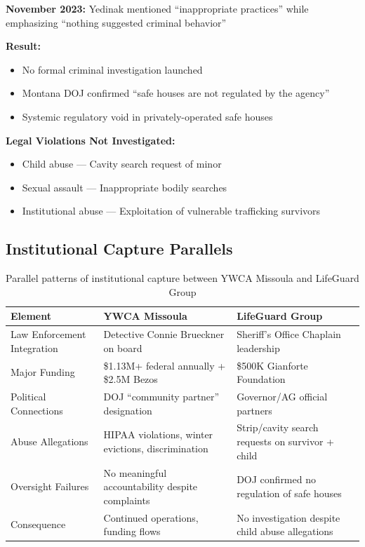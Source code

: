 \documentclass[11pt,letterpaper]{article}
\begin{document}
\textbf{November 2023:} Yedinak mentioned ``inappropriate practices'' while emphasizing ``nothing suggested criminal behavior''

\textbf{Result:}
\begin{itemize}[leftmargin=*]
\item No formal criminal investigation launched
\item Montana DOJ confirmed ``safe houses are not regulated by the agency''
\item Systemic regulatory void in privately-operated safe houses
\end{itemize}

\textbf{Legal Violations Not Investigated:}
\begin{itemize}[leftmargin=*]
\item Child abuse --- Cavity search request of minor
\item Sexual assault --- Inappropriate bodily searches
\item Institutional abuse --- Exploitation of vulnerable trafficking survivors
\end{itemize}

\subsection{Institutional Capture Parallels}

\begin{table}[H]
\centering
\footnotesize
\begin{tabularx}{\textwidth}{lXX}
\toprule
\textbf{Element} & \textbf{YWCA Missoula} & \textbf{LifeGuard Group}\\
\midrule
Law Enforcement Integration & Detective Connie Brueckner on board & Sheriff's Office Chaplain leadership\\
Major Funding & \$1.13M+ federal annually + \$2.5M Bezos & \$500K Gianforte Foundation\\
Political Connections & DOJ ``community partner'' designation & Governor/AG official partners\\
Abuse Allegations & HIPAA violations, winter evictions, discrimination & Strip/cavity search requests on survivor + child\\
Oversight Failures & No meaningful accountability despite complaints & DOJ confirmed no regulation of safe houses\\
Consequence & Continued operations, funding flows & No investigation despite child abuse allegations\\
\bottomrule
\end{tabularx}
\caption{Parallel patterns of institutional capture between YWCA Missoula and LifeGuard Group}
\end{table}
\end{document}
